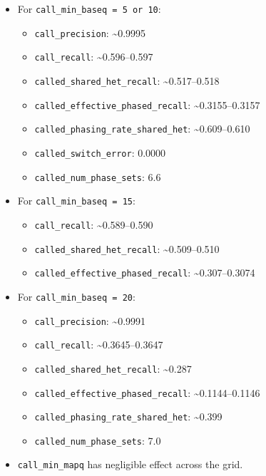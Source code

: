 \documentclass[
]{article}
\providecommand{\tightlist}{%
  \setlength{\itemsep}{0pt}\setlength{\parskip}{0pt}}
\begin{document}
\begin{itemize}
\tightlist
\item
  For \texttt{call\_min\_baseq\ =\ 5\ or\ 10}:

  \begin{itemize}
  \tightlist
  \item
    \texttt{call\_precision}: \textasciitilde0.9995
  \item
    \texttt{call\_recall}: \textasciitilde0.596--0.597
  \item
    \texttt{called\_shared\_het\_recall}: \textasciitilde0.517--0.518
  \item
    \texttt{called\_effective\_phased\_recall}:
    \textasciitilde0.3155--0.3157
  \item
    \texttt{called\_phasing\_rate\_shared\_het}:
    \textasciitilde0.609--0.610
  \item
    \texttt{called\_switch\_error}: 0.0000
  \item
    \texttt{called\_num\_phase\_sets}: 6.6
  \end{itemize}
\item
  For \texttt{call\_min\_baseq\ =\ 15}:

  \begin{itemize}
  \tightlist
  \item
    \texttt{call\_recall}: \textasciitilde0.589--0.590
  \item
    \texttt{called\_shared\_het\_recall}: \textasciitilde0.509--0.510
  \item
    \texttt{called\_effective\_phased\_recall}:
    \textasciitilde0.307--0.3074
  \end{itemize}
\item
  For \texttt{call\_min\_baseq\ =\ 20}:

  \begin{itemize}
  \tightlist
  \item
    \texttt{call\_precision}: \textasciitilde0.9991
  \item
    \texttt{call\_recall}: \textasciitilde0.3645--0.3647
  \item
    \texttt{called\_shared\_het\_recall}: \textasciitilde0.287
  \item
    \texttt{called\_effective\_phased\_recall}:
    \textasciitilde0.1144--0.1146
  \item
    \texttt{called\_phasing\_rate\_shared\_het}: \textasciitilde0.399
  \item
    \texttt{called\_num\_phase\_sets}: 7.0
  \end{itemize}
\item
  \texttt{call\_min\_mapq} has negligible effect across the grid.
\end{itemize}
\end{document}
